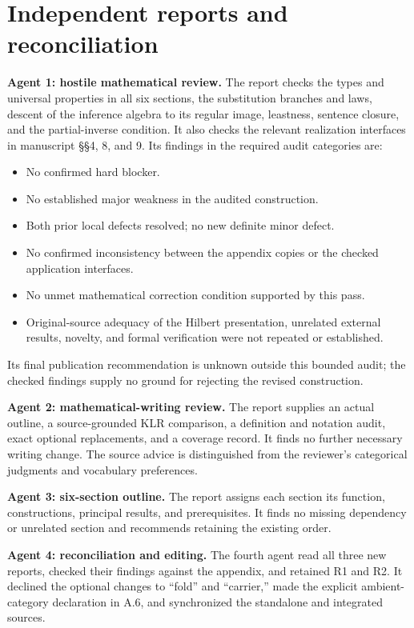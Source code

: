 \documentclass[10pt]{article}
\begin{document}
\section*{Independent reports and reconciliation}
\textbf{Agent 1: hostile mathematical review.}
The report checks the types and universal properties in all six sections,
the substitution branches and laws, descent of the inference algebra to its
regular image, leastness, sentence closure, and the partial-inverse condition.
It also checks the relevant realization interfaces in manuscript \S\S4, 8,
and 9. Its findings in the required audit categories are:
\begin{itemize}
\item[(A)] No confirmed hard blocker.
\item[(B)] No established major weakness in the audited construction.
\item[(C)] Both prior local defects resolved; no new definite minor defect.
\item[(D)] No confirmed inconsistency between the appendix copies or the checked
application interfaces.
\item[(E)] No unmet mathematical correction condition supported by this pass.
\item[(F)] Original-source adequacy of the Hilbert presentation, unrelated
external results, novelty, and formal verification were not repeated or established.
\end{itemize}
Its final publication recommendation is unknown outside this bounded audit;
the checked findings supply no ground for rejecting the revised construction.

\textbf{Agent 2: mathematical-writing review.}
The report supplies an actual outline, a source-grounded KLR comparison,
a definition and notation audit, exact optional replacements, and a coverage
record. It finds no further necessary writing change. The source advice is
distinguished from the reviewer's categorical judgments and vocabulary preferences.

\textbf{Agent 3: six-section outline.}
The report assigns each section its function, constructions, principal results,
and prerequisites. It finds no missing dependency or unrelated section and
recommends retaining the existing order.

\textbf{Agent 4: reconciliation and editing.}
The fourth agent read all three new reports, checked their findings against
the appendix, and retained R1 and R2. It declined the optional changes to
``fold'' and ``carrier,'' made the explicit ambient-category declaration
in A.6, and synchronized the standalone and integrated sources.
\end{document}
